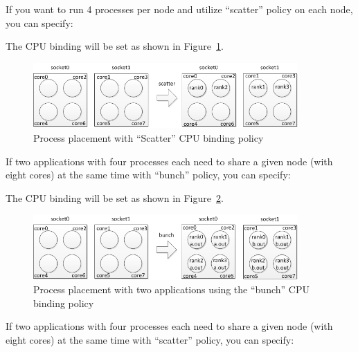 If you want to run 4 processes per node and utilize ``scatter'' policy on
each node, you can specify:


The CPU binding will be set as shown in Figure~\ref{fig:scatter}.

\begin{figure}[htbp]
 \centering
 \includegraphics[width=0.9\textwidth]{Img/nehalem-scatter.png}
 \caption{Process placement with ``Scatter'' CPU binding policy}
 \label{fig:scatter}
\end{figure}

If two applications with four processes each need to share
a given node (with eight cores) at the same time with ``bunch'' policy, you
can specify:



The CPU binding will be set as shown in Figure~\ref{fig:bunch2}.

\begin{figure}[htbp]
 \centering
 \includegraphics[width=0.9\textwidth]{Img/nehalem-bunch2.png}
 \caption{Process placement with two applications using the ``bunch'' CPU
			binding policy}
 \label{fig:bunch2}
\end{figure}

If two applications with four processes each need to share
a given node (with eight cores) at the same time
with ``scatter'' policy, you can specify:

